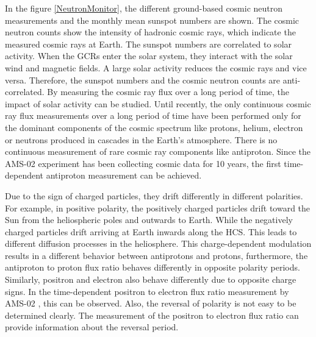 In the figure \ref{NeutronMonitor}, the different ground-based cosmic neutron measurements and the monthly mean sunspot numbers are shown. The cosmic neutron counts show the intensity of hadronic cosmic rays, which indicate the measured cosmic rays at Earth. The sunspot numbers are correlated to solar activity. When the GCRs enter the solar system, they interact with the solar wind and magnetic fields. A large solar activity reduces the cosmic rays and vice versa. Therefore, the sunspot numbers and the cosmic neutron counts are anti-correlated. By measuring the cosmic ray flux over a long period of time, the impact of solar activity can be studied. Until recently, the only continuous cosmic ray flux measurements over a long period of time have been performed only for the dominant components of the cosmic spectrum like protons, helium, electron or neutrons produced in cascades in the Earth’s atmosphere. There is no continuous measurement of rare cosmic ray components like antiproton. Since the AMS-02 experiment has been collecting cosmic data for 10 years, the first time-dependent antiproton measurement can be achieved.  \par 

Due to the sign of charged particles, they drift differently in different polarities. For example, in positive polarity, the positively charged particles drift toward the Sun from the heliospheric poles and outwards to Earth. While the negatively charged particles drift arriving at Earth inwards along the HCS. This leads to different diffusion processes in the heliosphere. This charge-dependent modulation results in a different behavior between antiprotons and protons, furthermore, the antiproton to proton flux ratio behaves differently in opposite polarity periods. Similarly, positron and electron also behave differently due to opposite charge signs. In the time-dependent positron to electron flux ratio measurement by AMS-02 \cite{AMSElectronPositronPaper}, this can be observed. Also, the reversal of polarity is not easy to be determined clearly. The measurement of the positron to electron flux ratio can provide information about the reversal period.





